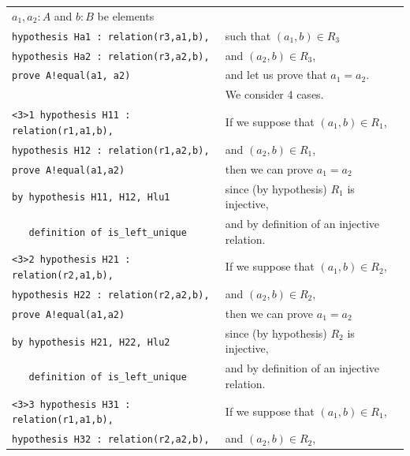 \documentclass[submission,copyright,creativecommons]{eptcs}
\begin{document}
\begin{table}
\begin{center}
{\begin{tabular}{|ll|}
$a_1,a_2:A$ and $b:B$ be elements\\
\hspace{1.6cm}  \verb+hypothesis Ha1 : relation(r3,a1,b),+ &
such that $(a_1,b) \in R_3$ \\
\hspace{1.6cm}  \verb+hypothesis Ha2 : relation(r3,a2,b),+ &
and $(a_2,b) \in R_3$, \\
\hspace{1.6cm}  \verb+prove A!equal(a1, a2)+& and let us prove that
$a_1=a_2$.\\
& We consider 4 cases.\\
\hspace{1.1cm}  \verb+<3>1 hypothesis H11 : relation(r1,a1,b),+ & If
we suppose that $(a_1,b) \in R_1$,\\
\hspace{1.9cm}  \verb+hypothesis H12 : relation(r1,a2,b),+ & and $(a_2,b) \in R_1$,\\
\hspace{1.9cm}  \verb+prove A!equal(a1,a2)+ & then we can prove
$a_1=a_2$ \\
\hspace{1.9cm}  \verb+by hypothesis H11, H12, Hlu1+ & since (by
hypothesis) $R_1$ is injective,\\
\hspace{1.9cm}  \verb+   definition of is_left_unique+ & and by
definition of an injective relation.\\
\hspace{1.1cm}  \verb+<3>2 hypothesis H21 : relation(r2,a1,b),+ & If
we suppose that $(a_1,b) \in R_2$,\\
\hspace{1.9cm}  \verb+hypothesis H22 : relation(r2,a2,b),+ & and $(a_2,b) \in R_2$,\\
\hspace{1.9cm}  \verb+prove A!equal(a1,a2)+ & then we can prove
$a_1=a_2$ \\
\hspace{1.9cm}  \verb+by hypothesis H21, H22, Hlu2+ & since (by
hypothesis) $R_2$ is injective,\\
\hspace{1.9cm}  \verb+   definition of is_left_unique+ & and by
definition of an injective relation.\\
\hspace{1.1cm}  \verb+<3>3 hypothesis H31 : relation(r1,a1,b),+ & If
we suppose that $(a_1,b) \in R_1$,\\
\hspace{1.9cm}  \verb+hypothesis H32 : relation(r2,a2,b),+ & and $(a_2,b) \in R_2$,\\

\end{tabular}}
\end{center}
\end{table}
\end{document}

